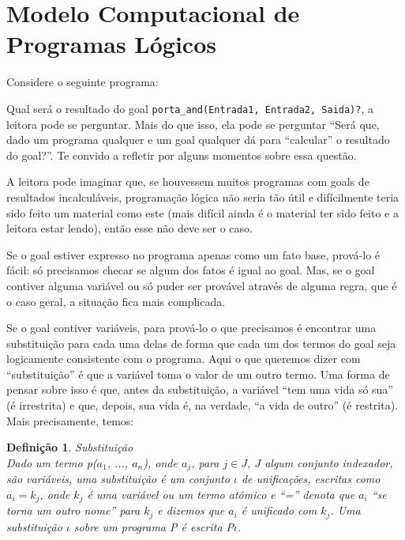 \documentclass{article}
\newtheorem{definition}{Definição}[section]
\theoremstyle{remark}
\theoremstyle{theorem}
\begin{document}
\section{Modelo Computacional de Programas Lógicos}

Considere o seguinte programa:




Qual será o resultado do goal {\tt porta\_and(Entrada1, Entrada2, Saida)?}, a leitora pode se perguntar. Mais do que isso, ela pode se perguntar ``Será que, dado um programa qualquer e um goal qualquer dá para ``calcular'' o resultado do goal?''. Te convido a refletir por alguns momentos sobre essa questão.


A leitora pode imaginar que, se houvessem muitos programas com goals de resultados incalculáveis, programação lógica não seria tão útil e difícilmente teria sido feito um material como este (mais difícil ainda é o material ter sido feito e a leitora estar lendo), então esse não deve ser o caso.

Se o goal estiver expresso no programa apenas como um fato base, prová-lo é fácil: só precisamos checar se algum dos fatos é igual ao goal. Mas, se o goal contiver alguma variável ou só puder ser provável através de alguma regra, que é o caso geral, a situação fica mais complicada.

Se o goal contiver variáveis, para prová-lo o que precisamos é encontrar uma substituição para cada uma delas de forma que cada um dos termos do goal seja logicamente consistente com o programa. Aqui o que queremos dizer com ``substituição'' é que a variável toma o valor de um outro termo. Uma forma de pensar sobre isso é que, antes da substituição, a variável ``tem uma vida só sua'' (é irrestrita) e que, depois, sua vida é, na verdade, ``a vida de
outro'' (é restrita). Mais precisamente, temos:\\

\begin{definition}{Substituição}\\
  Dado um termo {\it p($a_1$, ..., $a_n$)}, onde $a_j$, para $j \in J$, $J$ algum conjunto indexador, são variáveis, uma substituição é um conjunto $\iota$ de \textit{unificações}, escritas como $a_i = k_j$, onde $k_j$ é uma variável ou um termo atômico e ``='' denota que $a_i$ ``se torna um outro nome'' para $k_j$ e dizemos que $a_i$ é unificado com $k_j$.
  Uma substituição $\iota$ sobre um programa P é escrita P$\iota$.
\end{definition}
\end{document}
